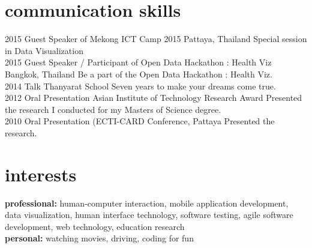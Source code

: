 \documentclass[]{friggeri-cv} %
\begin{document}

\section{communication skills}

\begin{entrylist}
\entry
{2015}
{Guest Speaker of Mekong ICT Camp 2015}
{Pattaya, Thailand}
{Special session in Data Visualization}\\

\entry
{2015}
{Guest Speaker / Participant of Open Data Hackathon : Health Viz}
{Bangkok, Thailand}
{Be a part of the Open Data Hackathon : Health Viz. }\\

\entry
{2014}
{Talk}
{Thanyarat School}
{Seven years to make your dreams come true.}\\

\entry
{2012}
{Oral Presentation}
{Asian Institute of Technology Research Award}
{Presented the research I conducted for my Masters of Science degree.}\\
\entry
{2010}
{Oral Presentation}
{(ECTI-CARD Conference, Pattaya}
{Presented the research.}\\
\end{entrylist}


\section{interests}

\textbf{professional:} human-computer interaction, mobile application development, data visualization, human interface technology, software testing, agile software development, web technology, education research\\
\textbf{personal:} watching movies, driving, coding for fun

\end{document}

